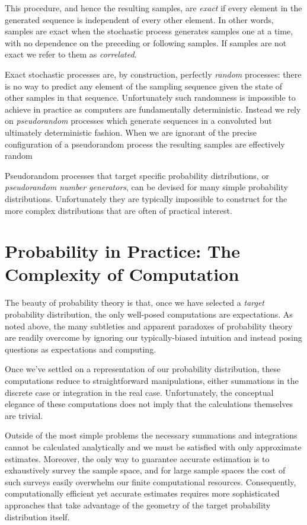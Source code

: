 \documentclass[11pt, oneside]{article}
\begin{document}
This procedure, and hence the resulting samples, are \emph{exact} 
if every element in the generated sequence is independent of every 
other element.  In other words, samples are exact when the stochastic
process generates samples one at a time, with no dependence on the 
preceding or following samples.  If samples are not exact we refer to
them as \emph{correlated}.

Exact stochastic processes are, by construction, perfectly
\emph{random} processes: there is no way to predict any element 
of the sampling sequence given the state of other samples in
that sequence.  Unfortunately such randomness is impossible to 
achieve in practice as computers are fundamentally deterministic.
Instead we rely on \emph{pseudorandom} processes which
generate sequences in a convoluted but ultimately deterministic
fashion.  When we are ignorant of the precise configuration of a
pseudorandom process the resulting samples are effectively
random

Pseudorandom processes that target specific probability distributions, 
or \emph{pseudorandom number generators}, can be devised for 
many simple probability distributions.  Unfortunately they are typically 
impossible to construct for the more complex distributions that are
often of practical interest.

\section{Probability in Practice: The Complexity of Computation}

The beauty of probability theory is that, once we have selected a
\emph{target} probability distribution, the only well-posed computations
are expectations.  As noted above, the many subtleties and apparent 
paradoxes of probability theory are readily overcome by ignoring our
typically-biased intuition and instead posing questions as expectations
and computing.

Once we've settled on a representation of our probability distribution, 
these computations reduce to straightforward manipulations, either 
summations in the discrete case or integration in the real case.  
Unfortunately, the conceptual elegance of these computations does not 
imply that the calculations themselves are trivial.  

Outside of the most simple problems the necessary summations and 
integrations cannot be calculated analytically and we must be satisfied 
with only approximate estimates.  Moreover, the only way to guarantee
accurate estimation is to exhaustively survey the sample space, and
for large sample spaces the cost of such surveys easily overwhelm our 
finite computational resources.  Consequently, computationally efficient 
yet accurate estimates requires more sophisticated approaches that take
advantage of the geometry of the target probability distribution itself.
\end{document}
